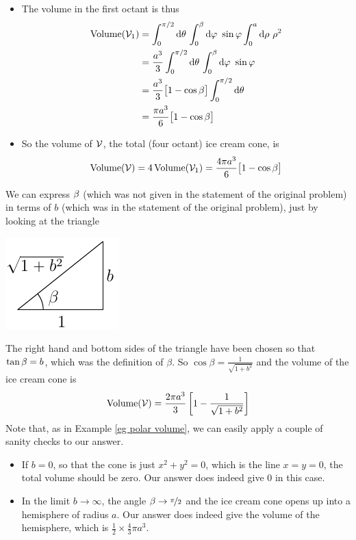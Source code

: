 \begin{eg}
\begin{itemize}
\item
The volume in the first octant is thus
\begin{align*}
\text{Volume}(\cV_1)
&=\int_0^{\pi/2}\dee{\theta}\,\int_0^\beta \dee{\varphi}\ \sin\varphi
               \int_0^a\dee{\rho}\  \rho^2 \\
&=\frac{a^3}{3}\int_0^{\pi/2}\dee{\theta}\,
         \int_0^\beta \dee{\varphi}\ \sin\varphi \\
&=\frac{a^3}{3}\big[1-\cos\be\big]\int_0^{\pi/2}\dee{\theta} \\
&=\frac{\pi a^3}{6}\big[1-\cos\be\big]
\end{align*}
\item
So the volume of $\mathcal{V}$, the total (four octant) ice cream cone, is 
\begin{equation*}
\text{Volume}(\mathcal{V})=4\,\text{Volume}(\mathcal{V}_1)
=\frac{4\pi a^3}{6}\big[1-\cos\beta\big]
\end{equation*}
\end{itemize}
We can express $\beta$ (which was not given in the statement of the
original problem) in terms of $b$ (which was in the statement of the
original problem), just by looking at the triangle
\begin{efig}
\begin{center}
    \includegraphics{triangleIceCream.pdf}
\end{center}
\end{efig}
The right hand and bottom sides of the triangle have been chosen so that
$\tan\beta=b$, which was the definition of $\beta$. So
$\cos\beta=\frac{1}{\sqrt{1+b^2}}$ and the volume of the ice cream cone is
\begin{equation*}
\text{Volume}(\mathcal{V})
=\frac{2\pi a^3}{3}\left[1-\frac{1}{\sqrt{1+b^2}}\right]
\end{equation*}
Note that, as in Example \ref{eg polar volume}, we can easily apply a 
couple of sanity checks to our answer.
\begin{itemize}
\item 
If $b=0$, so that the cone is just $x^2+y^2=0$, which is the line $x=y=0$,
the total volume should be zero. Our answer does indeed give
$0$ in this case.
\item
In the limit $b\rightarrow\infty$, the angle $\beta\rightarrow\nicefrac{\pi}{2}$ and the ice cream cone opens up into 
a hemisphere of radius $a$. Our answer does indeed give the volume of 
the hemisphere, which is $\frac{1}{2}\times\frac{4}{3}\pi a^3$.
\end{itemize}


\end{eg}



